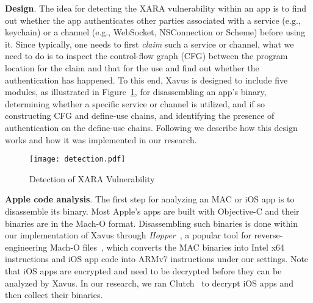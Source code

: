 \documentclass{article}
\newcommand{\ignore}[1]{}
\begin{document}
\vspace {3pt}\noindent\textbf{Design}. The idea for detecting the XARA vulnerability within an app is to find out whether the app authenticates other parties associated with a service (e.g., keychain) or a channel (e.g., WebSocket, NSConnection or Scheme) before using it.  Since typically, one needs to first \textit{claim} such a service or channel, what we need to do is to inspect the control-flow graph (CFG) between the program location for the claim and that for the use and find out whether the authentication has happened. To this end, Xavus is designed to include five modules, as illustrated in  Figure~\ref{fig:detection}, for disassembling an app's binary, determining whether a specific service or channel is utilized, and if so constructing CFG and define-use chains\ignore{and if so the locations of the claim and the use,}, and identifying the presence of authentication on the define-use chains\ignore{program execution paths connecting these two locations}. Following we describe how this design works and how it was implemented in our research.

\begin{figure}[h]
\centering
\vspace{-7pt}
\texttt{[image: detection.pdf]}
\vspace{-10pt}
\vspace{-2pt}
\caption{Detection of XARA Vulnerability}
\label{fig:detection}

\vspace{-7pt}
\end{figure} 

\vspace {-3pt}
\vspace {3pt}\noindent\textbf{Apple code analysis}. The first step for analyzing an MAC or iOS app is to disassemble its binary.  Most Apple's apps are built with Objective-C and their binaries are in the Mach-O format.  Disassembling such binaries is done within our implementation of Xavus through \textit{Hopper}~\cite{hopper}, a popular tool for reverse-engineering Mach-O files~\cite{MachO}, which converts the MAC binaries into Intel x64 instructions and iOS app code into ARMv7 instructions under our settings.  Note that iOS apps are encrypted and need to be decrypted before they can be analyzed by Xavus.  In our research, we ran Clutch~\cite{Clutch} to decrypt iOS apps \ignore{a virtual-machine based memory dumper to}and then collect their binaries.
\end{document}
